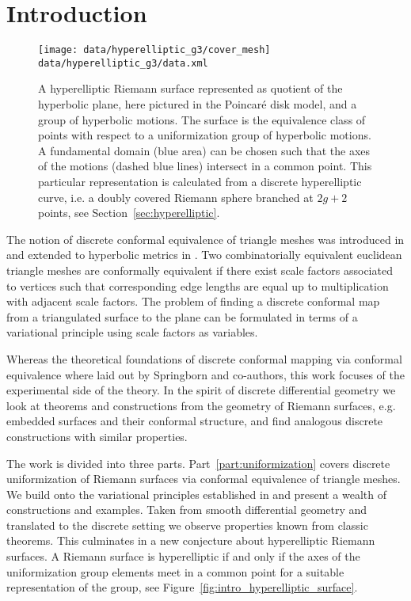 \documentclass[Thesis.tex]{subfiles}
\begin{document}
\chapter{Introduction}

\begin{figure}
\centering
\texttt{[image: data/hyperelliptic\_g3/cover\_mesh]}\\
{\scriptsize\tt data/hyperelliptic\_g3/data.xml} 
\caption{A hyperelliptic Riemann surface represented as quotient of the hyperbolic plane, here pictured in the Poincar{\'e} disk model, and a group of hyperbolic motions. The surface is the equivalence class of points with respect to a uniformization group of hyperbolic motions. A fundamental domain (blue area) can be chosen such that the axes of the motions (dashed blue lines) intersect in a common point. This particular representation is calculated from a discrete hyperelliptic curve, i.e. a doubly covered Riemann sphere branched at $2g + 2$ points, see Section~\ref{sec:hyperelliptic}.}
\label{fig:regular_cover} 
\end{figure}

The notion of discrete conformal equivalence of triangle meshes was introduced in \cite{Springborn2008} and extended to hyperbolic metrics in \cite{Bobenko2010}. Two combinatorially equivalent euclidean triangle meshes are conformally equivalent if there exist scale factors associated to vertices such that corresponding edge lengths are equal up to multiplication with adjacent scale factors.
The problem of finding a discrete conformal map from a triangulated surface to the plane can be formulated in terms of a variational principle using scale factors as variables. 

Whereas the theoretical foundations of discrete conformal mapping via conformal equivalence where laid out by Springborn and co-authors, this work focuses of the experimental side of the theory. In the spirit of discrete differential geometry we look at theorems and constructions from the geometry of Riemann surfaces, e.g. embedded surfaces and their conformal structure, and find analogous discrete constructions with similar properties.

The work is divided into three parts. Part~\ref{part:uniformization} covers discrete uniformization of Riemann surfaces via conformal equivalence of triangle meshes. We build onto the variational principles established in \cite{Bobenko2010} and present a wealth of constructions and examples. Taken from smooth differential geometry and translated to the discrete setting we observe properties known from classic theorems. This culminates in a new conjecture about hyperelliptic Riemann surfaces. A Riemann surface is hyperelliptic if and only if the axes of the uniformization group elements meet in a common point for a suitable representation of the group, see Figure~\ref{fig:intro_hyperelliptic_surface}.
\end{document}
